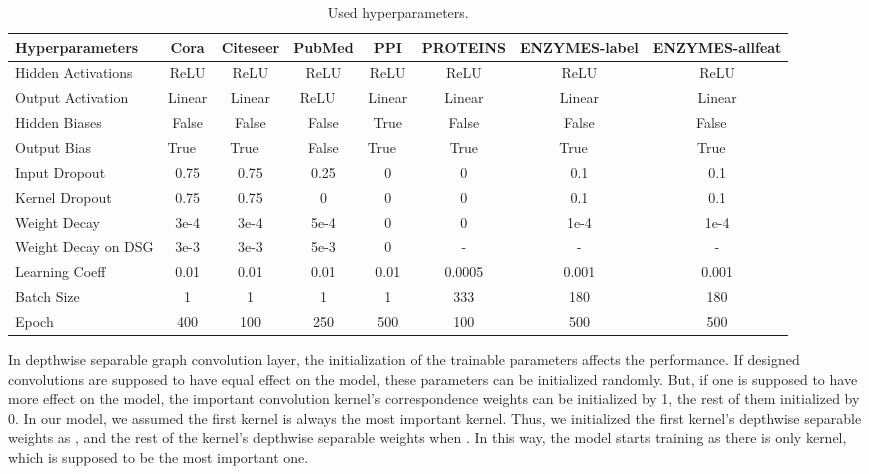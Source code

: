 \documentclass{article}
\begin{document}
\begin{table}\renewcommand{\arraystretch}{1.3}
\caption{Used hyperparameters.}
\scriptsize
\centering
\begin{tabular}{l c c c c c c c }
\hline
Hyperparameters & Cora & Citeseer & PubMed & PPI & PROTEINS & ENZYMES-label & ENZYMES-allfeat \\
\hline

Hidden Activations & ReLU & ReLU & ReLU & ReLU & ReLU & ReLU & ReLU \\

Output Activation & Linear & Linear & ReLU  & Linear & Linear & Linear & Linear \\

Hidden Biases & False & False & False & True & False & False & False  \\

Output Bias & True  & True  & False & True  & True & True  & True  \\

Input Dropout & 0.75 & 0.75 &0.25 & 0 & 0 & 0.1 & 0.1 \\
Kernel Dropout & 0.75 & 0.75 &0 & 0 & 0 & 0.1 & 0.1 \\
Weight Decay &3e-4 & 3e-4 & 5e-4 & 0 & 0 & 1e-4 & 1e-4 \\
Weight Decay on DSG & 3e-3 & 3e-3 & 5e-3 & 0 &- & - & - \\
Learning Coeff & 0.01 & 0.01 & 0.01 & 0.01 & 0.0005 & 0.001 & 0.001 \\
Batch Size & 1 & 1 & 1 & 1 & 333 & 180 & 180 \\
Epoch & 400 & 100 & 250 & 500 &100 &500 &500 \\
\hline
\end{tabular}
\label{tablehyper}
\end{table}

In depthwise separable graph convolution layer, the initialization of the trainable parameters  affects the performance. If designed convolutions are supposed to have equal effect on the model, these parameters can be initialized randomly. But, if one is supposed to have more effect on the model, the important convolution kernel's correspondence weights can be initialized by 1, the rest of them initialized by 0. In our model, we assumed the first kernel is always the most important kernel. Thus, we initialized the first kernel's depthwise separable weights as , and the rest of the kernel's depthwise separable weights  when . In this way, the model starts training as there is only kernel, which is supposed to be the most important one.
\end{document}
